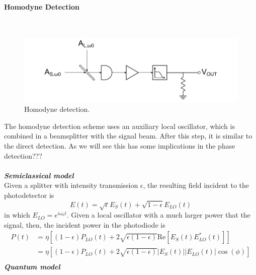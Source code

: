 \begin{bibunit}[plain]
\paragraph{Homodyne Detection}\ \\
%
%
\begin{figure}[H]
	\centering
	\includegraphics{./sdf/optical_detection/figures/detection-homodyne.pdf}
	\caption{Homodyne detection.}
\end{figure}
The homodyne detection scheme uses an auxiliary local oscillator, which is combined in
a beamsplitter with the signal beam. After this step, it is similar to the direct detection. As we will see this has some implications in the phase detection???\\
\\
{\bf \em Semiclassical model}\\
Given a splitter with intensity transmission $\epsilon$, the resulting field incident to the photodetector is
\cite{shapiro1985quantum} %
%
\begin{equation}
	E(t) = \sqrt{\epsilon}E_S(t) + \sqrt{1-\epsilon}E_{LO}(t)
\end{equation}
%
in which $E_{LO} = e^{i \omega_0 t}$.
Given a local oscillator with a much larger power that the signal, then, the incident power in the photodiode is
%
\begin{align}
	P(t)	&= \eta \left[ (1-\epsilon) P_{LO}(t) + 2 \sqrt{\epsilon (1-\epsilon)} \textrm{Re} \left[ E_S(t) E^\ast_{LO}(t) \right] \right]\\
			&= \eta \left[ (1-\epsilon) P_{LO}(t) + 2 \sqrt{\epsilon (1-\epsilon)} |E_S(t)| |E_{LO}(t)| \cos{(\phi)} \right]\\
\end{align}
%
%
{\bf \em Quantum model}\\
%
%

\end{bibunit}
